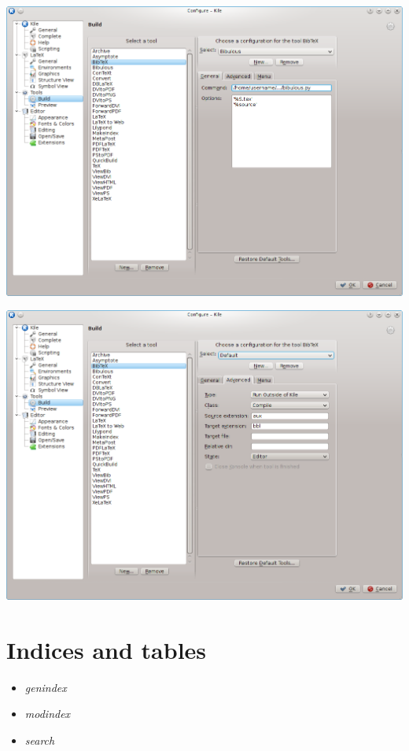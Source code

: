 \documentclass[letterpaper,10pt,english]{sphinxmanual}
\begin{document}
\includegraphics{screenshot_for_kile_instructions.png}

\includegraphics{screenshot_for_kile_instructions2.png}


\chapter{Indices and tables}
\label{index:indices-and-tables}\begin{itemize}
\item {} 
\emph{genindex}

\item {} 
\emph{modindex}

\item {} 
\emph{search}

\end{itemize}



\renewcommand{\indexname}{Index}
\printindex
\end{document}
